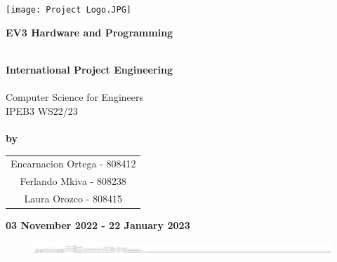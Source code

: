 
\begin{titlepage}
		
\centering
~\\~\\
\texttt{[image: Project Logo.JPG]}
\\[1.5cm]

\begin{center}
\Large\textbf{EV3 Hardware and Programming}\par
~\\
\textbf{\large{International Project Engineering}}\\
~\\
\large{Computer Science for Engineers}\\
\large{IPEB3 WS22/23 }\\
~\\
\large	\textbf{by}\\[0.5cm]
\begin{threeparttable}
	\begin{tabular}{c}
		Encarnacion Ortega - 808412 \\
		Ferlando Mkiva - 808238 \\
		Laura Orozco - 808415\\[0.5cm]
		\end{tabular}	
\end{threeparttable}
\end{center}
\textbf{03 November 2022 - 22 January 2023}

\vfill

\begin{figure}[b]
	\includegraphics[width=\linewidth]{Graphics/bottomLogo}
\end{figure}

\end{titlepage}	
\restoregeometry 